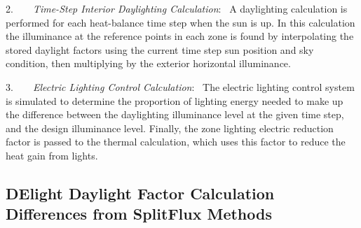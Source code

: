 2.~~~~\emph{Time-Step Interior Daylighting Calculation}:~ A daylighting calculation is performed for each heat-balance time step when the sun is up. In this calculation the illuminance at the reference points in each zone is found by interpolating the stored daylight factors using the current time step sun position and sky condition, then multiplying by the exterior horizontal illuminance.

3.~~~~\emph{Electric Lighting Control Calculation}:~ The electric lighting control system is simulated to determine the proportion of lighting energy needed to make up the difference between the daylighting illuminance level at the given time step, and the design illuminance level. Finally, the zone lighting electric reduction factor is passed to the thermal calculation, which uses this factor to reduce the heat gain from lights.

\subsection{DElight Daylight Factor Calculation Differences from SplitFlux Methods}\label{delight-daylight-factor-calculation-differences-from-energyplus-detailed-methods}

